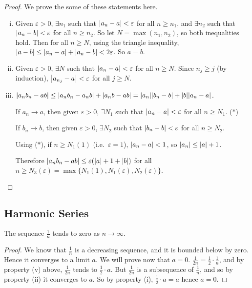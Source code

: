 \begin{proof}
	We prove the some of these statements here.
	\begin{enumerate}[(i)]
		\item Given \(\varepsilon > 0\), \(\exists n_1\) such that \(\abs{a_n - a} < \varepsilon\) for all \(n \geq n_1\), and \(\exists n_2\) such that \(\abs{a_n - b} < \varepsilon\) for all \(n \geq n_2\).
		      So let \(N = \max(n_1, n_2)\), so both inequalities hold.
		      Then for all \(n \geq N\), using the triangle inequality, \(\abs{a - b} \leq \abs{a_n - a} + \abs{a_n - b} < 2\varepsilon\).
		      So \(a=b\).
		\item Given \(\varepsilon > 0\), \(\exists N\) such that \(\abs{a_n - a} < \varepsilon\) for all \(n \geq N\).
		      Since \(n_j \geq j\) (by induction), \(\abs{a_{n_j} - a} < \varepsilon\) for all \(j \geq N\).
		      \setcounter{enumi}{4}
		\item \(\abs{a_n b_n - ab} \leq \abs{a_n b_n - a_n b} + \abs{a_n b - ab} = \abs{a_n}\abs{b_n - b} + \abs{b}\abs{a_n - a}\).

		      If \(a_n \to a\), then given \(\varepsilon > 0\), \(\exists N_1\) such that \(\abs{a_n - a} < \varepsilon\) for all \(n \geq N_1\).
		      (\(\ast\))

		      If \(b_n \to b\), then given \(\varepsilon > 0\), \(\exists N_2\) such that \(\abs{b_n - b} < \varepsilon\) for all \(n \geq N_2\).

		      Using (\(\ast\)), if \(n \geq N_1(1)\) (i.e.\ \(\varepsilon = 1\)), \(\abs{a_n - a} < 1\), so \(\abs{a_n} \leq \abs{a} + 1\).

		      Therefore \(\abs{a_n b_n - ab} \leq \varepsilon(\abs{a} + 1 + \abs{b})\) for all \(n \geq N_3(\varepsilon) = \max\{ N_1(1), N_1(\varepsilon), N_2(\varepsilon) \}\).
	\end{enumerate}
\end{proof}

\subsection{Harmonic Series}
\begin{lemma}
	The sequence \(\frac{1}{n}\) tends to zero as \(n \to \infty\).
\end{lemma}
\begin{proof}
	We know that \(\frac{1}{n}\) is a decreasing sequence, and it is bounded below by zero.
	Hence it converges to a limit \(a\).
	We will prove now that \(a = 0\).
	\(\frac{1}{2n} = \frac{1}{2}\cdot \frac{1}{n}\), and by property (v) above, \(\frac{1}{2n}\) tends to \(\frac{1}{2}\cdot a\).
	But \(\frac{1}{2n}\) is a subsequence of \(\frac{1}{n}\), and so by property (ii) it converges to \(a\).
	So by property (i), \(\frac{1}{2} \cdot a = a\) hence \(a=0\).
\end{proof}

